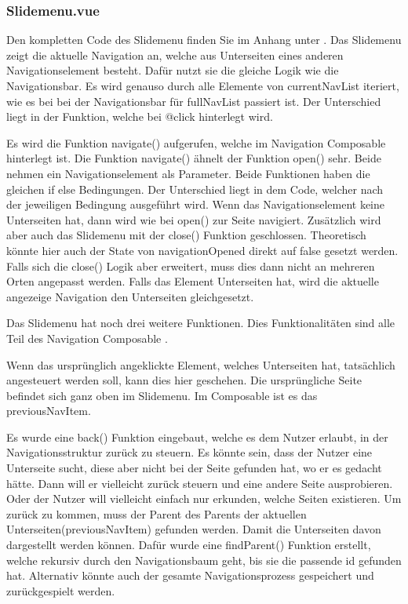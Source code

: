 \subsubsection{Slidemenu.vue}
\label{sec:Slidemenu.vue}

Den kompletten Code des Slidemenu finden Sie im Anhang unter .
Das Slidemenu zeigt die aktuelle Navigation an, welche aus Unterseiten eines anderen Navigationselement besteht. Dafür nutzt sie die gleiche Logik wie die Navigationsbar. Es wird genauso durch alle Elemente von currentNavList iteriert, wie es bei bei der Navigationsbar für fullNavList passiert ist. Der Unterschied liegt in der Funktion, welche bei @click hinterlegt wird. 

Es wird die Funktion navigate() aufgerufen, welche im Navigation Composable hinterlegt ist. Die Funktion navigate() ähnelt der Funktion open() sehr. Beide nehmen ein Navigationselement als Parameter. Beide Funktionen haben die gleichen if else Bedingungen. Der Unterschied liegt in dem Code, welcher nach der jeweiligen Bedingung ausgeführt wird. Wenn das Navigationselement keine Unterseiten hat, dann wird wie bei open() zur Seite navigiert. Zusätzlich wird aber auch das Slidemenu mit der close() Funktion geschlossen. Theoretisch könnte hier auch der State von navigationOpened direkt auf false gesetzt werden. Falls sich die close() Logik aber erweitert, muss dies dann nicht an mehreren Orten angepasst werden. Falls das Element Unterseiten hat, wird die aktuelle angezeige Navigation den Unterseiten gleichgesetzt.

Das Slidemenu hat noch drei weitere Funktionen. Dies Funktionalitäten sind alle Teil des Navigation Composable .

Wenn das ursprünglich angeklickte Element, welches Unterseiten hat, tatsächlich angesteuert werden soll, kann dies hier geschehen. Die ursprüngliche Seite befindet sich ganz oben im Slidemenu. Im Composable ist es das previousNavItem.

Es wurde eine back() Funktion eingebaut, welche es dem Nutzer erlaubt, in der Navigationsstruktur zurück zu steuern. Es könnte sein, dass der Nutzer eine Unterseite sucht, diese aber nicht bei der Seite gefunden hat, wo er es gedacht hätte. Dann will er vielleicht zurück steuern und eine andere Seite ausprobieren. Oder der Nutzer will vielleicht einfach nur erkunden, welche Seiten existieren. Um zurück zu kommen, muss der Parent des Parents der aktuellen Unterseiten(previousNavItem) gefunden werden. Damit die Unterseiten davon dargestellt werden können. Dafür wurde eine findParent() Funktion erstellt, welche rekursiv durch den Navigationsbaum geht, bis sie die passende id gefunden hat. Alternativ könnte auch der gesamte Navigationsprozess gespeichert und zurückgespielt werden.

